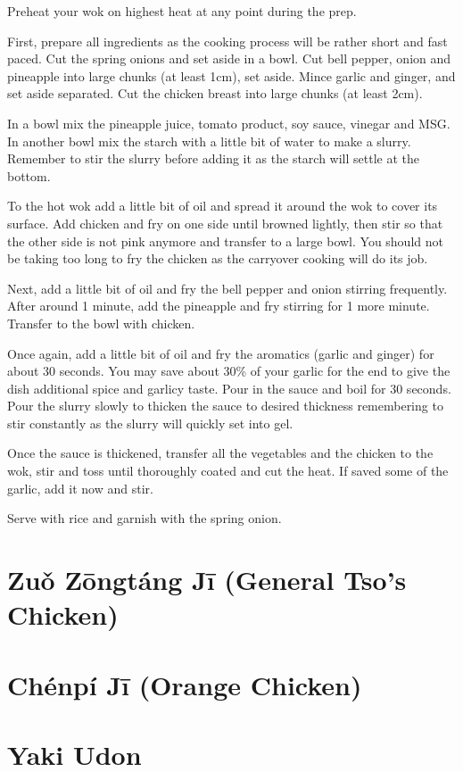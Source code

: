 Preheat your wok on highest heat at any point during the prep.

First, prepare all ingredients as the cooking process will be rather short and
fast paced. Cut the spring onions and set aside in a bowl. Cut bell pepper,
onion and pineapple into large chunks (at least 1cm), set aside. Mince garlic
and ginger, and set aside separated. Cut the chicken breast into large chunks
(at least 2cm).

In a bowl mix the pineapple juice, tomato product, soy sauce, vinegar and MSG.
In another bowl mix the starch with a little bit of water to make a slurry.
Remember to stir the slurry before adding it as the starch will settle at the
bottom.

To the hot wok add a little bit of oil and spread it around the wok to cover
its surface. Add chicken and fry on one side until browned lightly, then stir
so that the other side is not pink anymore and transfer to a large bowl. You
should not be taking too long to fry the chicken as the carryover cooking will
do its job.

Next, add a little bit of oil and fry the bell pepper and onion stirring
frequently. After around 1 minute, add the pineapple and fry stirring for 1
more minute. Transfer to the bowl with chicken.

Once again, add a little bit of oil and fry the aromatics (garlic and ginger)
for about 30 seconds. You may save about 30\% of your garlic for the end to
give the dish additional spice and garlicy taste. Pour in the sauce and boil
for 30 seconds. Pour the slurry slowly to thicken the sauce to desired
thickness remembering to stir constantly as the slurry will quickly set into
gel.

Once the sauce is thickened, transfer all the vegetables and the chicken to the
wok, stir and toss until thoroughly coated and cut the heat. If saved some of
the garlic, add it now and stir.

Serve with rice and garnish with the spring onion.

\section{Zuǒ Zōngtáng Jī (General Tso's Chicken)}
\section{Chénpí Jī (Orange Chicken)}
\section{Yaki Udon}
